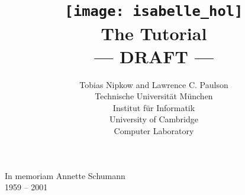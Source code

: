 \documentclass{article}
\begin{document}
\title{\texttt{[image: isabelle\_hol]}
       \\ \vspace{0.5cm} The Tutorial
       \\ --- DRAFT ---}
\author{Tobias Nipkow and Lawrence C. Paulson\\[1ex]
Technische Universit{\"a}t M{\"u}nchen \\
Institut f{\"u}r Informatik \\[1ex]
University of Cambridge\\
Computer Laboratory}
\maketitle

\setcounter{page}{5}
\vspace*{\fill}
\begin{center}
\LARGE In memoriam Annette Schumann\\[1ex]
1959 -- 2001
\end{center}
\vspace*{\fill}
\vspace*{\fill}
\newpage


\tableofcontents

\cleardoublepage{}












\printindex
\end{document}
